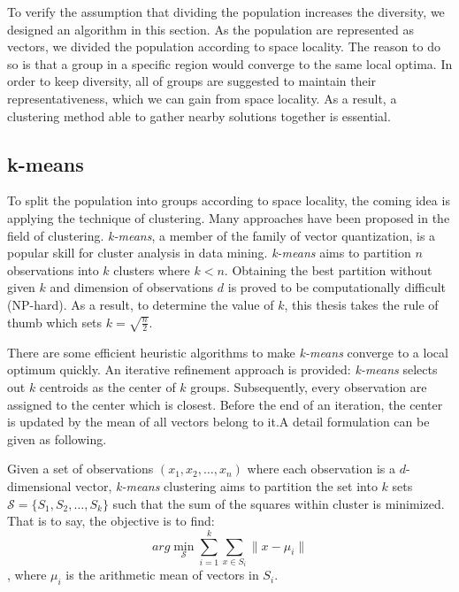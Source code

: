 To verify the assumption that dividing the population increases the
diversity, we designed an algorithm in this section. 
As the population are represented as vectors, we divided the population
according to space locality.
The reason to do so is that a group in a specific region would converge
to the same local optima.
In order to keep diversity, all of groups are suggested to maintain
their representativeness, which we can gain from space locality.
As a result, a clustering method able to gather nearby solutions
together is essential.

\subsection{k-means}

To split the population into groups according to space locality, the
coming idea is applying the technique of clustering.
Many approaches have been proposed in the field of clustering.
\emph{k-means}, a member of the family of vector quantization, is a
popular skill for cluster analysis in data mining.
\emph{k-means} aims to partition $n$ observations into $k$ clusters
where $k < n $.
Obtaining the best partition without given $k$ and dimension of
observations $d$ is proved to be computationally difficult (NP-hard).
As a result, to determine the value of $k$, this thesis takes the rule
of thumb which sets $k = \sqrt{\frac{n}{2}}$.

There are some efficient heuristic algorithms to make \emph{k-means}
converge to a local optimum quickly.
An iterative refinement approach is provided: \emph{k-means} selects
out $k$ centroids as the center of $k$ groups.
Subsequently, every observation are assigned to the center which is closest.
Before the end of an iteration, the center is updated by the mean of all vectors
belong to it.A detail formulation can be given as following.

Given a set of observations $\left( x_1, x_2, \ldots, x_n\right)$ where each
observation is a $d$-dimensional vector, \emph{k-means} clustering aims to
partition the set into $k$ sets $\mathcal{S} = \{ S_1, S_2, \ldots, S_k \}$ such
that the sum of the squares within cluster is minimized.
That is to say, the objective is to find:
\[arg\min_{\mathcal{S}}\sum\limits_{i=1}^k \sum\limits_{x \in S_i}
\|x-\mu_i\|\], where $\mu_i$ is the arithmetic mean of vectors in $S_i$.

